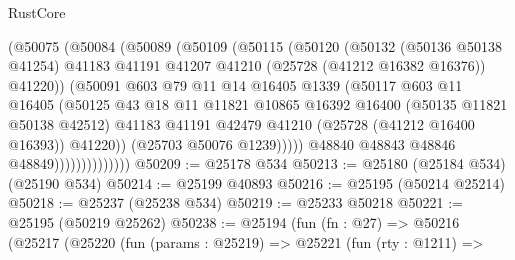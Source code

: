 \begin{lexlean}{RustCore}
\begin{coremodule}
                            (@50075
                              (@50084
                                (@50089
                                  (@50109
                                    (@50115
                                      (@50120
                                        (@50132
                                          (@50136 @50138 @41254)
                                          @41183
                                          @41191
                                          @41207
                                          @41210
                                          (@25728 (@41212 @16382 @16376))
                                          @41220))
                                      (@50091
                                        @603
                                        @79
                                        @11
                                        @14
                                        @16405
                                        @1339
                                        (@50117
                                          @603
                                          @11
                                          @16405
                                          (@50125
                                            @43
                                            @18
                                            @11
                                            @11821
                                            @10865
                                            @16392
                                            @16400
                                            (@50135 @11821 @50138 @42512)
                                            @41183
                                            @41191
                                            @42479
                                            @41210
                                            (@25728 (@41212 @16400 @16393))
                                            @41220))
                                        (@25703 @50076 @1239)))))
                                @48840
                                @48843
                                @48846
                                @48849))))))))))))))
@50209 := @25178 @534
@50213 := @25180 (@25184 @534) (@25190 @534)
@50214 := @25199 @40893
@50216 := @25195 (@50214 @25214)
@50218 := @25237 (@25238 @534)
@50219 := @25233 @50218
@50221 := @25195 (@50219 @25262)
@50238 := @25194
    (fun (fn : @27) =>
    @50216
      (@25217
        (@25220
          (fun (params : @25219) =>
          @25221
            (fun (rty : @1211) =>

\end{coremodule}
\end{lexlean}
